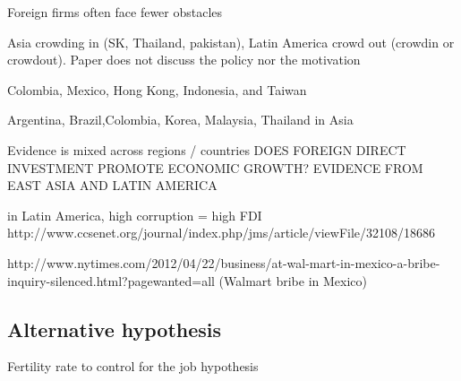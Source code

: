 \documentclass[12pt]{article}
\begin{document}
Foreign firms often face fewer obstacles

Asia crowding in (SK, Thailand, pakistan), Latin America crowd out (crowdin or crowdout). Paper does not discuss the policy nor the motivation

Colombia, Mexico, Hong Kong, Indonesia, and Taiwan

Argentina, Brazil,Colombia, Korea, Malaysia, Thailand in Asia

Evidence is mixed across regions / countries DOES FOREIGN DIRECT INVESTMENT PROMOTE ECONOMIC GROWTH? EVIDENCE FROM EAST ASIA AND LATIN AMERICA 

in Latin America, high corruption = high FDI http://www.ccsenet.org/journal/index.php/jms/article/viewFile/32108/18686

http://www.nytimes.com/2012/04/22/business/at-wal-mart-in-mexico-a-bribe-inquiry-silenced.html?pagewanted=all (Walmart bribe in Mexico)

\subsection{Alternative hypothesis}

Fertility rate to control for the job hypothesis

\clearpage


\end{document}
